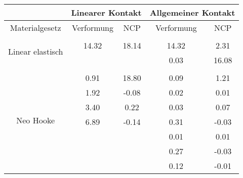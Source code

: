 \begin{table} 
\centering 
\begin{tabular}{c|cc|cc|} 
\cline{2-5} 
 & \multicolumn{2}{|c|}{Linearer Kontakt} & \multicolumn{2}{|c|}{Allgemeiner Kontakt} \\ 
\hline 
\multicolumn{1}{|c|}{Materialgesetz} & \multicolumn{1}{c|}{Verformung} & \multicolumn{1}{c|}{NCP} & \multicolumn{1}{c|}{Verformung} & \multicolumn{1}{c|}{NCP} \\ 
\hline 
\multicolumn{1}{|c|}{\multirow{3}{*}{Linear elastisch}} &\multicolumn{1}{|c|}{} & \multicolumn{1}{|c|}{} & \multicolumn{1}{|c|}{} & \multicolumn{1}{|c|}{} \\ 
\multicolumn{1}{|c|}{} & \multicolumn{1}{|c|}{     14.32} & \multicolumn{1}{|c|}{     18.14} & \multicolumn{1}{|c|}{     14.32} & \multicolumn{1}{|c|}{      2.31} \\ 
\multicolumn{1}{|c|}{} & \multicolumn{1}{|c|}{} & \multicolumn{1}{|c|}{} & \multicolumn{1}{|c|}{      0.03} & \multicolumn{1}{|c|}{     16.08} \\ 
\hline 
\multicolumn{1}{|c|}{\multirow{15}{*}{Neo Hooke}} &\multicolumn{1}{|c|}{} & \multicolumn{1}{|c|}{} & \multicolumn{1}{|c|}{} & \multicolumn{1}{|c|}{} \\ 
\multicolumn{1}{|c|}{} & \multicolumn{1}{|c|}{      0.91} & \multicolumn{1}{|c|}{     18.80} & \multicolumn{1}{|c|}{      0.09} & \multicolumn{1}{|c|}{      1.21} \\ 
\multicolumn{1}{|c|}{} & \multicolumn{1}{|c|}{      1.92} & \multicolumn{1}{|c|}{     -0.08} & \multicolumn{1}{|c|}{      0.02} & \multicolumn{1}{|c|}{      0.01} \\ 
\multicolumn{1}{|c|}{} & \multicolumn{1}{|c|}{      3.40} & \multicolumn{1}{|c|}{      0.22} & \multicolumn{1}{|c|}{      0.03} & \multicolumn{1}{|c|}{      0.07} \\ 
\multicolumn{1}{|c|}{} & \multicolumn{1}{|c|}{      6.89} & \multicolumn{1}{|c|}{     -0.14} & \multicolumn{1}{|c|}{      0.31} & \multicolumn{1}{|c|}{     -0.03} \\ 
\multicolumn{1}{|c|}{} & \multicolumn{1}{|c|}{} & \multicolumn{1}{|c|}{} & \multicolumn{1}{|c|}{      0.01} & \multicolumn{1}{|c|}{      0.01} \\ 
\multicolumn{1}{|c|}{} & \multicolumn{1}{|c|}{} & \multicolumn{1}{|c|}{} & \multicolumn{1}{|c|}{      0.27} & \multicolumn{1}{|c|}{     -0.03} \\ 
\multicolumn{1}{|c|}{} & \multicolumn{1}{|c|}{} & \multicolumn{1}{|c|}{} & \multicolumn{1}{|c|}{      0.12} & \multicolumn{1}{|c|}{     -0.01} \\ 

\end{tabular}
\end{table}
